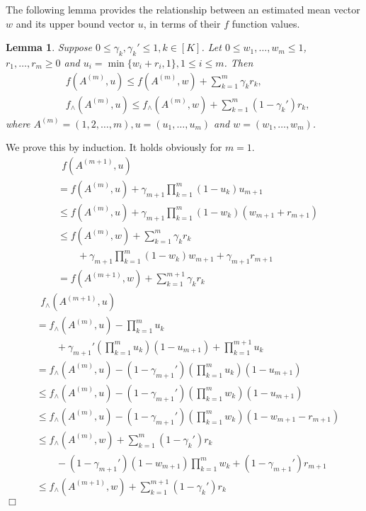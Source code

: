 \documentclass{article}
\newtheorem{lemma}[theorem]{Lemma}%
\newenvironment{proof}{\noindent {\textbf{Proof. }}}{$\Box$ \medskip}
\begin{document}
The following lemma provides the relationship between an estimated mean vector $w$
	and its upper bound vector $u$, in terms of their $f$ function values.
\begin{lemma}
\label{lem:estimateTech}
Suppose $0 \leq \gamma_k, \gamma_k' \leq 1, k \in [K]$. Let $0 \leq w_1, \ldots, w_m \leq 1$, $r_1, \ldots, r_m \geq 0$ and $u_i = \min\{w_i + r_i, 1\}, 1 \leq i \leq m$. Then
\begin{align*}
&f(A^{(m)}, u) \leq f(A^{(m)}, w) + \sum_{k=1}^{m} \gamma_k r_k,\\
&f_{\wedge}(A^{(m)}, u) \leq f_{\wedge}(A^{(m)}, w) + \sum_{k=1}^{m} (1 - \gamma_k') r_k,
\end{align*}
where $A^{(m)} = (1, 2, \ldots, m), u = (u_1, \ldots, u_m)$ and $w = (w_1, \ldots, w_m)$.
\end{lemma}
\begin{proof}
We prove this by induction. It holds obviously for $m = 1$.
\begin{align*}
&~~f(A^{(m+1)}, u)\\
&= f(A^{(m)}, u) + \gamma_{m+1}\prod_{k=1}^m(1 - u_k) u_{m+1}\\
&\leq f(A^{(m)}, u) +  \gamma_{m+1} \prod_{k=1}^m(1 - w_k) (w_{m+1} + r_{m+1})\\
&\leq f(A^{(m)}, w) + \sum_{k=1}^m \gamma_k r_k \\
&\qquad + \gamma_{m+1} \prod_{k=1}^m(1 - w_k) w_{m+1} + \gamma_{m+1} r_{m+1}\\
&= f(A^{(m+1)}, w) + \sum_{k=1}^{m+1} \gamma_k r_k
\end{align*}
\begin{align*}
&~~f_{\wedge}(A^{(m+1)}, u) \\
&= f_{\wedge}(A^{(m)}, u) -\prod_{k=1}^{m} u_k \\
&\qquad+ \gamma_{m+1}' (\prod_{k=1}^{m} u_k) (1 - u_{m+1})+ \prod_{k=1}^{m+1} u_k\\
&= f_{\wedge}(A^{(m)}, u) - (1 - \gamma_{m+1}') (\prod_{k=1}^{m} u_k) (1 - u_{m+1})\\
&\leq f_{\wedge}(A^{(m)}, u) - (1 - \gamma_{m+1}') (\prod_{k=1}^{m} w_k) (1 - u_{m+1})\\
&\leq f_{\wedge}(A^{(m)}, u) -(1 - \gamma_{m+1}') (\prod_{k=1}^{m} w_k)  (1 - w_{m+1} - r_{m+1})\\
&\leq f_{\wedge}(A^{(m)}, w) +  \sum_{k=1}^{m} (1 - \gamma_k') r_k \\
&\qquad - (1 - \gamma_{m+1}') (1 - w_{m+1}) \prod_{k=1}^{m} w_k + (1 - \gamma_{m+1}') r_{m+1}\\
&\leq f_{\wedge}(A^{(m+1)}, w) + \sum_{k=1}^{m+1} (1 - \gamma_k') r_k
\end{align*}
\end{proof}
\end{document}
